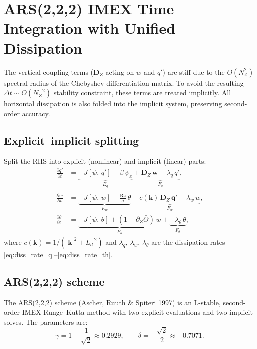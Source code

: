 \documentclass[11pt]{article}
\newcommand{\pderiv}[2]{\frac{\partial #1}{\partial #2}}
\newcommand{\Rav}{\widetilde{\mathrm{Ra}}}
\newcommand{\Ld}{L_d}
\newcommand{\kh}{|\bm{k}|}
\newcommand{\Jac}[2]{J\!\left[#1,\,#2\right]}
\newcommand{\Dvec}{\bm{D}}
\begin{document}
\section{ARS(2,2,2) IMEX Time Integration with Unified Dissipation}
\label{sec:imex}

The vertical coupling terms ($\Dvec_Z$ acting on $w$ and $q'$) are stiff due to the $O(N_Z^2)$ spectral radius of the Chebyshev differentiation matrix. To avoid the resulting $\Delta t \sim O(N_Z^{-2})$ stability constraint, these terms are treated implicitly. All horizontal dissipation is also folded into the implicit system, preserving second-order accuracy.

\subsection{Explicit--implicit splitting}

Split the RHS into explicit (nonlinear) and implicit (linear) parts:
\begin{align}
\pderiv{q'}{t} &= \underbrace{-\Jac{\psi}{q'} - \beta\,\psi_x}_{\displaystyle E_q} + \underbrace{\Dvec_Z\,\bm{w} - \lambda_q\,q'}_{\displaystyle F_q}, \label{eq:split_q}\\
\pderiv{w}{t} &= \underbrace{-\Jac{\psi}{w} + \frac{\Rav}{\sigma}\,\theta}_{\displaystyle E_w} + \underbrace{c(\bm{k})\,\Dvec_Z\,\bm{q}' - \lambda_w\,w}_{\displaystyle F_w}, \label{eq:split_w}\\
\pderiv{\theta}{t} &= \underbrace{-\Jac{\psi}{\theta} + (1 - \partial_Z\bar\Theta)\,w}_{\displaystyle E_\theta} + \underbrace{-\lambda_\theta\,\theta}_{\displaystyle F_\theta}, \label{eq:split_th}
\end{align}
where $c(\bm{k}) = 1/(\kh^2 + \Ld^{-2})$ and $\lambda_q$, $\lambda_w$, $\lambda_\theta$ are the dissipation rates \eqref{eq:diss_rate_q}--\eqref{eq:diss_rate_th}.

\subsection{ARS(2,2,2) scheme}
\label{sec:ars222}

The ARS(2,2,2) scheme (Ascher, Ruuth \& Spiteri 1997) is an L-stable, second-order IMEX Runge--Kutta method with two explicit evaluations and two implicit solves. The parameters are:
\begin{equation}
\gamma = 1 - \frac{1}{\sqrt{2}} \approx 0.2929, \qquad \delta = -\frac{\sqrt{2}}{2} \approx -0.7071.
\end{equation}
\end{document}
